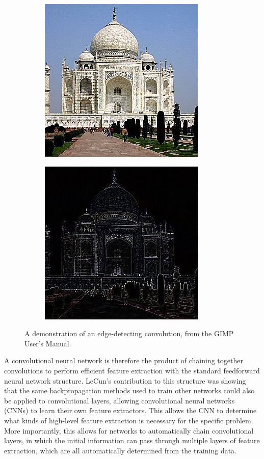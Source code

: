 \begin{figure}[!htb]
  \begin{subfigure}{0.5\textwidth}
    \centering
    \includegraphics{images/gimp_original}
  \end{subfigure}%
  \begin{subfigure}{0.5\textwidth}
    \centering
    \includegraphics{images/gimp_edgedetect}
  \end{subfigure}

  \caption{A demonstration of an edge-detecting convolution, from the GIMP User's Manual. \cite{gimpconvolution}}
  \label{fig:gimp_edge}
\end{figure}

A convolutional neural network is therefore the product of chaining together convolutions to perform efficient feature extraction with the standard feedforward neural network structure.
LeCun's contribution to this structure was showing that the same backpropagation methods used to train other networks could also be applied to convolutional layers, allowing convolutional neural networks (CNNs) to learn their own feature extractors.
This allows the CNN to determine what kinds of high-level feature extraction is necessary for the specific problem.
More importantly, this allows for networks to automatically chain convolutional layers, in which the initial information can pass through multiple layers of feature extraction, which are all automatically determined from the training data.

